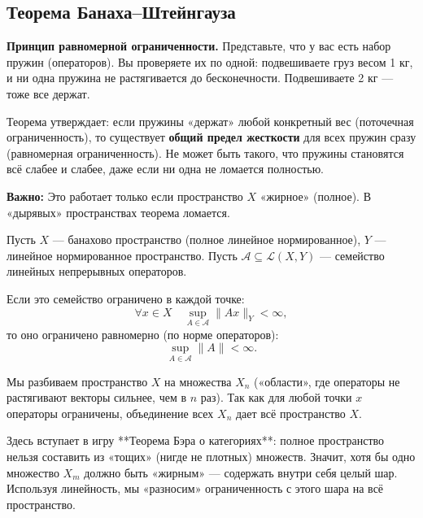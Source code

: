 
\subsection{Теорема Банаха--Штейнгауза}

\begin{idea}
	\textbf{Принцип равномерной ограниченности.}
	Представьте, что у вас есть набор пружин (операторов). Вы проверяете их по одной: подвешиваете груз весом 1 кг, и ни одна пружина не растягивается до бесконечности. Подвешиваете 2 кг — тоже все держат.
	
	Теорема утверждает: если пружины «держат» любой конкретный вес (поточечная ограниченность), то существует \textbf{общий предел жесткости} для всех пружин сразу (равномерная ограниченность). Не может быть такого, что пружины становятся всё слабее и слабее, даже если ни одна не ломается полностью.
	
	\textbf{Важно:} Это работает только если пространство $X$ «жирное» (полное). В «дырявых» пространствах теорема ломается.
\end{idea}

\begin{theorem}\label{Banach-Steingaus}
	Пусть $X$ --- банахово пространство (полное линейное нормированное), $Y$ --- линейное нормированное пространство.
	Пусть $\mathcal{A} \subseteq \mathcal{L}(X, Y)$ --- семейство линейных непрерывных операторов.
	
	Если это семейство ограничено в каждой точке:
	\[ \forall x \in X \quad \sup_{A \in \mathcal{A}} \|Ax\|_Y < \infty, \]
	то оно ограничено равномерно (по норме операторов):
	\[ \sup_{A \in \mathcal{A}} \|A\| < \infty. \]
\end{theorem}

\begin{idea}
	Мы разбиваем пространство $X$ на множества $X_n$ («области», где операторы не растягивают векторы сильнее, чем в $n$ раз).
	Так как для любой точки $x$ операторы ограничены, объединение всех $X_n$ дает всё пространство $X$.
	
	Здесь вступает в игру **Теорема Бэра о категориях**: полное пространство нельзя составить из «тощих» (нигде не плотных) множеств. Значит, хотя бы одно множество $X_m$ должно быть «жирным» — содержать внутри себя целый шар.
	Используя линейность, мы «разносим» ограниченность с этого шара на всё пространство.
\end{idea}


